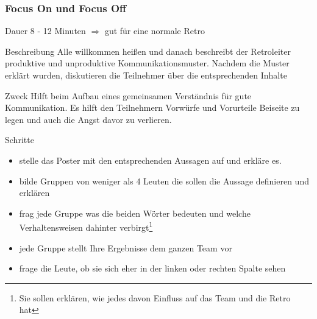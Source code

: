 \subsubsection{Focus On und Focus Off}
\begin{Beschreibungfett}[Beschreibung]
  \item [Dauer] 8 - 12 Minuten $\Rightarrow$  gut für eine normale Retro
  \item [Beschreibung] Alle willkommen heißen und danach beschreibt der Retroleiter
  produktive und unproduktive Kommunikationsmuster. Nachdem die Muster erklärt wurden,
  diskutieren die Teilnehmer über die entsprechenden Inhalte
\item [Zweck] Hilft beim Aufbau eines gemeinsamen Verständnis für gute Kommunikation. Es
  hilft den Teilnehmern Vorwürfe und Vorurteile Beiseite zu legen und auch die Angst davor zu
  verlieren.
  \item [Schritte]
    \begin{itemize}
      \item stelle das Poster mit den entsprechenden Aussagen auf und erkläre es.
      \item bilde Gruppen von weniger als 4 Leuten die sollen die Aussage definieren und erklären
      \item frag jede Gruppe was die beiden Wörter bedeuten und welche Verhaltensweisen dahinter
        verbirgt\footnote{Sie sollen erklären, wie jedes davon Einfluss auf das Team und die Retro
          hat}
      \item jede Gruppe stellt Ihre Ergebnisse dem ganzen Team vor
      \item frage die Leute, ob sie sich eher in der linken oder rechten Spalte sehen
    \end{itemize}
\end{Beschreibungfett}



